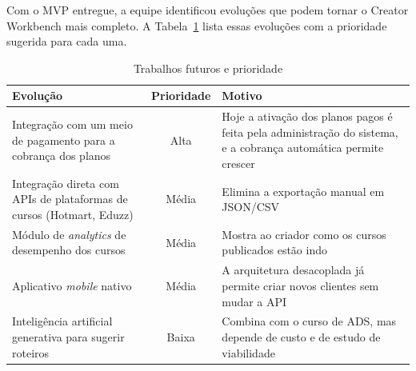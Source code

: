 Com o MVP entregue, a equipe identificou evoluções que podem tornar o Creator Workbench mais completo. A Tabela~\ref{tab:futuros} lista essas evoluções com a prioridade sugerida para cada uma.

\begin{table}[H]
\centering
\small
\caption{Trabalhos futuros e prioridade}
\label{tab:futuros}
\begin{tabular}{|p{5cm}|c|p{6.5cm}|}
\hline
\textbf{Evolução} & \textbf{Prioridade} & \textbf{Motivo} \\
\hline
Integração com um meio de pagamento para a cobrança dos planos & Alta & Hoje a ativação dos planos pagos é feita pela administração do sistema, e a cobrança automática permite crescer \\
\hline
Integração direta com APIs de plataformas de cursos (Hotmart, Eduzz) & Média & Elimina a exportação manual em JSON/CSV \\
\hline
Módulo de \textit{analytics} de desempenho dos cursos & Média & Mostra ao criador como os cursos publicados estão indo \\
\hline
Aplicativo \textit{mobile} nativo & Média & A arquitetura desacoplada já permite criar novos clientes sem mudar a API \\
\hline
Inteligência artificial generativa para sugerir roteiros & Baixa & Combina com o curso de ADS, mas depende de custo e de estudo de viabilidade \\
\hline
\end{tabular}
\end{table}